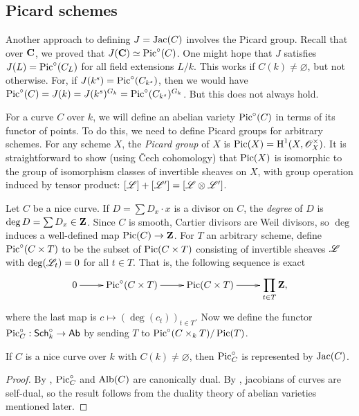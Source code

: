 \subsection{Picard schemes}\label{sec:picard-scheme}

Another approach to defining $J=\operatorname{Jac}(C)$ involves the Picard group. Recall 
that over $\mathbf{C}$, we proved that $J(\mathbf{C})\simeq\operatorname{Pic}^\circ(C)$. 
One might hope that $J$ satisfies $J(L)=\operatorname{Pic}^\circ(C_L)$ for all field 
extensions $L/k$. This works if $C(k)\ne\varnothing$, but not otherwise. For, 
if $J(k^s)=\operatorname{Pic}^\circ(C_{k^s})$, then we would have 
$\operatorname{Pic}^\circ(C) = J(k) = J(k^s)^{G_k} = \operatorname{Pic}^\circ(C_{k^s})^{G_k}$. But this 
does not always hold. 

For a curve $C$ over $k$, we will define an abelian variety $\operatorname{Pic}^\circ(C)$ in 
terms of its functor of points. To do this, we need to define Picard groups for 
arbitrary schemes. For any scheme $X$, the \emph{Picard group} of $X$ is 
$\operatorname{Pic}(X)=\operatorname{H}^1(X,\mathscr{O}_X^\times)$. It is straightforward to show (using \v Cech 
cohomology) that $\operatorname{Pic}(X)$ is isomorphic to the group of isomorphism classes of 
invertible sheaves on $X$, with group operation induced by tensor product: 
$[\mathscr{L}] + [\mathscr{L'}] = [\mathscr{L}\otimes \mathscr{L}']$. 

Let $C$ be a nice curve. If $D=\sum D_x\cdot x$ is a divisor on $C$, the 
\emph{degree} of $D$ is $\deg D=\sum D_x\in \mathbf{Z}$. Since $C$ is smooth, Cartier 
divisors are Weil divisors, so $\deg$ induces a well-defined map 
$\operatorname{Pic}(C)\to \mathbf{Z}$. For $T$ an arbitrary scheme, define 
$\operatorname{Pic}^\circ(C\times T)$ to be the subset of $\operatorname{Pic}(C\times T)$ consisting of 
invertible sheaves $\mathscr{L}$ with $\deg(\mathscr{L}_t)=0$ for all $t\in T$. That is, the 
following sequence is exact 
\[\xymatrix{
  0 \ar[r] 
    & \picard^\circ(C\times T) \ar[r] 
    & \picard(C\times T) \ar[r] 
    & \displaystyle\prod_{t\in T} \dZ \text{,}
}\]
where the last map is $c\mapsto (\deg(c_t))_{t\in T}$. Now we define the 
functor $\operatorname{Pic}_C^\circ:\mathsf{Sch}_k^\circ\to\mathsf{Ab}$ by sending $T$ to 
$\operatorname{Pic}^\circ(C\times_k T)/\operatorname{Pic}(T)$. 

\begin{theorem}
If $C$ is a nice curve over $k$ with $C(k)\ne \varnothing$, then 
$\operatorname{Pic}_C^\circ$ is represented by $\operatorname{Jac}(C)$.
\end{theorem}
\begin{proof}
By \cite[A.6]{mo12}, $\operatorname{Pic}_C^\circ$ and $\operatorname{Alb}(C)$ are canonically 
dual. By \cite[8.10.22]{bg06}, jacobians of curves are self-dual, so the result 
follows from the duality theory of abelian varieties mentioned later. 
\end{proof}

